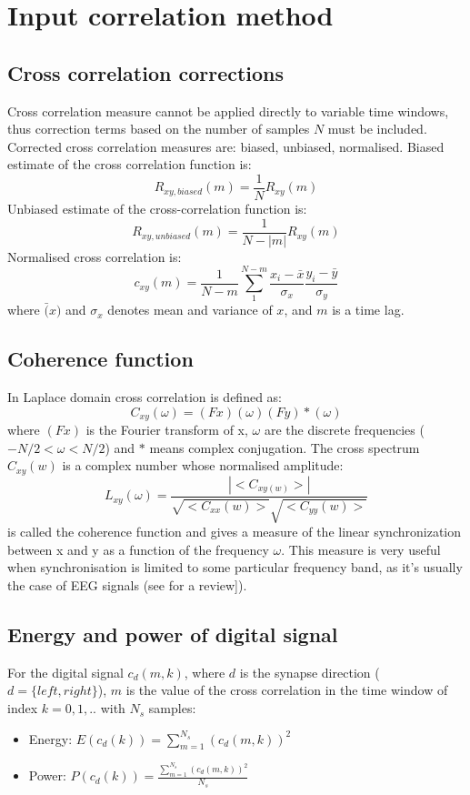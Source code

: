 
\section{Input correlation method}
\subsection{Cross correlation corrections \label{Appendix:crosscorr}}

Cross correlation measure cannot be applied directly to variable time windows,
thus correction terms based on the number of samples $N$ must be included.
Corrected cross correlation measures are: biased, unbiased, normalised.
Biased estimate of the cross correlation function is:
\begin{equation}
 R_{xy,biased}(m)=\frac{1}{N} R_{xy}(m)
\end{equation}
Unbiased estimate of the cross-correlation function is:
\begin{equation}
 R_{xy,unbiased}(m)=\frac{1}{N-|m|} R_{xy}(m)
\end{equation}
Normalised cross correlation is:
\begin{equation}
c_{xy}(m)=\frac{1}{N-m} \sum_{1}^{N-m} \frac{x_{i}-\bar{x}}{\sigma_{x}} \frac{y_{i}-\bar{y}}{\sigma_{y}}
\end{equation}
where $\bar(x)$ and $\sigma_{x}$ denotes mean and variance of $x$, and $m$ is a time lag.
\subsection{Coherence function}
In Laplace domain cross correlation is defined as:
\begin{equation}
 C_{xy}(\omega)=(Fx)(\omega)(Fy)*(\omega)
\end{equation}
where $(Fx)$ is the Fourier  transform of x, $\omega$ are the discrete
frequencies ($-N/2<\omega<N/2$) and $*$ means complex conjugation.
The cross spectrum $C_{xy}(w)$ is a complex number whose normalised amplitude:
\begin{equation}
 L_{xy}(\omega)=\frac{|<C_{xy(w)}>|}{\sqrt{<C_{xx}(w)>}\sqrt{<C_{yy}(w)>}}
\end{equation}
is called the coherence function and gives a measure of the linear synchronization
 between x and y as a function of the frequency $\omega$. This measure
is very useful when synchronisation is limited to some particular frequency
band, as it's usually the case of EEG signals (see \citep{EEGxcorr} for a review]).
\subsection{Energy and power of digital signal}
\label{app:energy}
For the digital signal $c_{d}(m,k)$, where $d$ is the synapse direction ($d=\{left,right\}$), $m$
is the value of the cross correlation in the time window of index $k=0,1,..$ with $N_{s}$ samples:
\begin{itemize}
\item Energy: $E(c_{d}(k))=\sum_{m=1}^{N_{s}} (c_{d}(m,k))^2$
\item Power: $P(c_{d}(k))=\frac{\sum_{m=1}^{N_{s}} (c_{d}(m,k))^2}{N_{s}}$
\end{itemize}


